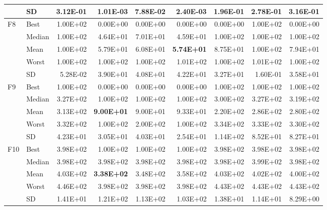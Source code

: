 \documentclass[10pt,a4paper]{article}
\newcommand{\bestval}[1]{\textbf{#1}}
\begin{document}
\begin{table}[p]
\begin{tabular}{llrrrrrrr}
 & SD & 3.12E-01 & 1.01E-03 & 7.88E-02 & 2.40E-03 & 1.96E-01 & 2.78E-01 & 3.16E-01 \\
\midrule
F8 & Best & 1.00E+02 & 0.00E+00 & 0.00E+00 & 0.00E+00 & 0.00E+00 & 1.00E+02 & 0.00E+00 \\
 & Median & 1.00E+02 & 4.64E+01 & 7.01E+01 & 4.59E+01 & 1.00E+02 & 1.00E+02 & 1.00E+02 \\
 & Mean & 1.00E+02 & 5.79E+01 & 6.08E+01 & \bestval{5.74E+01} & 8.75E+01 & 1.00E+02 & 7.94E+01 \\
 & Worst & 1.00E+02 & 1.00E+02 & 1.00E+02 & 1.01E+02 & 1.00E+02 & 1.01E+02 & 1.00E+02 \\
 & SD & 5.28E-02 & 3.90E+01 & 4.08E+01 & 4.22E+01 & 3.27E+01 & 1.60E-01 & 3.58E+01 \\
\midrule
F9 & Best & 1.00E+02 & 0.00E+00 & 0.00E+00 & 0.00E+00 & 1.00E+02 & 1.00E+02 & 1.00E+02 \\
 & Median & 3.27E+02 & 1.00E+02 & 1.00E+02 & 1.00E+02 & 3.00E+02 & 3.27E+02 & 3.19E+02 \\
 & Mean & 3.13E+02 & \bestval{9.00E+01} & 9.00E+01 & 9.33E+01 & 2.20E+02 & 2.86E+02 & 2.80E+02 \\
 & Worst & 3.32E+02 & 1.00E+02 & 2.00E+02 & 1.00E+02 & 3.34E+02 & 3.33E+02 & 3.30E+02 \\
 & SD & 4.23E+01 & 3.05E+01 & 4.03E+01 & 2.54E+01 & 1.14E+02 & 8.52E+01 & 8.27E+01 \\
\midrule
F10 & Best & 3.98E+02 & 1.00E+02 & 1.00E+02 & 1.00E+02 & 3.98E+02 & 3.98E+02 & 3.98E+02 \\
 & Median & 3.98E+02 & 3.98E+02 & 3.98E+02 & 3.98E+02 & 3.98E+02 & 3.99E+02 & 3.98E+02 \\
 & Mean & 4.03E+02 & \bestval{3.38E+02} & 3.48E+02 & 3.58E+02 & 4.03E+02 & 4.02E+02 & 4.00E+02 \\
 & Worst & 4.46E+02 & 3.98E+02 & 3.98E+02 & 3.98E+02 & 4.43E+02 & 4.43E+02 & 4.43E+02 \\
 & SD & 1.41E+01 & 1.21E+02 & 1.13E+02 & 1.03E+02 & 1.38E+01 & 1.14E+01 & 8.29E+00 \\
\bottomrule
\end{tabular}
\end{table}
\end{document}
